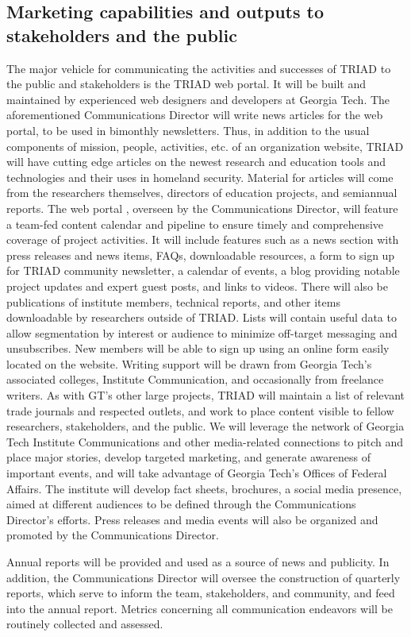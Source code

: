 \documentclass[12pt]{article}
\begin{document}
\subsection{Marketing  capabilities and outputs to stakeholders and the public}
\label{sec:marketing}

The major vehicle for communicating the activities and successes of TRIAD to the public and stakeholders is the TRIAD web portal.
It will be built and maintained by experienced web designers and developers at Georgia Tech.
The aforementioned Communications Director will write news articles for the web portal, to be used in bimonthly newsletters.
Thus, in addition to the usual components of mission, people, activities, etc. of an organization website, TRIAD will have cutting edge articles on the newest research and education tools and technologies and their uses in homeland security.
Material for articles will come from the researchers themselves, directors of education projects, and semiannual reports.
The web portal
, overseen by the Communications Director,
will feature a team-fed content calendar and pipeline to ensure timely and comprehensive coverage of project activities.
It will include features such as a news section with press releases and news items, FAQs, downloadable resources, a form to sign up for TRIAD community newsletter, a calendar of events, a blog providing notable project updates and expert guest posts, and links to videos.
There will also be publications of institute members, technical reports, and other items downloadable by researchers outside of TRIAD.
Lists will contain useful data to allow segmentation by interest or audience to minimize off-target messaging and unsubscribes.
New members will be able to sign up using an online form easily located on the website.
Writing support will be drawn from Georgia Tech's associated colleges, Institute Communication, and occasionally from freelance writers.
As with GT's other large projects, TRIAD will maintain a list of relevant trade journals and respected outlets, and work to place content visible to fellow researchers, stakeholders, and the public.
We will leverage the network of Georgia Tech Institute Communications and other media-related connections to pitch and place major stories, develop targeted marketing, and generate awareness of important events, and will take advantage of Georgia Tech's Offices of Federal Affairs.
The institute will develop fact sheets, brochures, a social media presence, aimed at different audiences to be defined through the Communications Director's efforts.
Press releases and media events will also be organized and promoted by the Communications Director.

Annual reports will be provided and used as a source of news and publicity.
In addition, the Communications Director will oversee the construction of quarterly reports, which serve to inform the team, stakeholders, and community, and feed into the annual report.
Metrics concerning all communication endeavors will be routinely collected and assessed.
\end{document}
